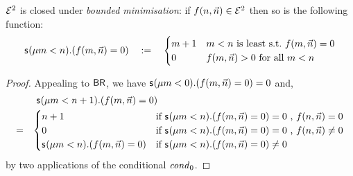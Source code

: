 \documentclass{lmcs}
\begin{document}
\begin{lemma}
	\label{lem:bdmin}
	$\mathcal{E}^2$ is closed under \emph{bounded minimisation}:
	if $f(n , \vec n) \in \mathcal{E}^2$ then so is the following function:
	\[
	\mathsf s_{}(\mu m < n ). (f(m,\vec n) = 0 )\quad  := \quad
	\begin{cases}
	m+1 & \text{$m<n$ is least s.t.\ $f(m, \vec n) = 0$} \\
	0 & \text{$f(m, \vec n) > 0$ for all $m<n$}
	\end{cases}
	\]
\end{lemma}
\begin{proof}
	Appealing to $\mathsf{BR}$, we have $\mathsf s_{}(\mu m < 0) .( f(m , \vec n ) = 0 ) =  0$ and,
	\[
	\begin{array}{rl}
	& \ \least {m < n+1} .( f(m, \vec n ) = 0) \\
	\noalign{\smallskip}
	= & 
	\begin{cases}
	n+1 & \text{if $\least{m < n }. (f(m, \vec n ) = 0) =0$ ,  $f(n,\vec n) = 0$}\\
	0 & \text{if $\least {m < n }. (f(m, \vec n ) = 0) = 0$ ,  $f(n,\vec n) \neq 0$}\\
	\least {m < n} . (f(m, \vec n ) = 0) & \text{if $\least {m < n} . (f(m, \vec n )=0 )\neq 0$ }
	\end{cases}
	\end{array}
	\]
	by two applications of the conditional $\mathit{cond}_0$.
\end{proof}

%
%
%
\end{document}
